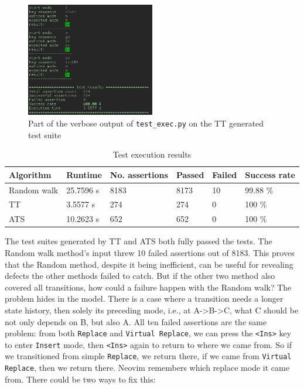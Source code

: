 \documentclass[12pt]{article}
\begin{document}
		\begin{figure}[!h]
			\centering
			\includegraphics[width=0.5\textwidth]{images/test_exec_run_TT.png}
			\caption{Part of the verbose output of \texttt{test\_exec.py} on the TT generated test suite}
		\end{figure}

		\begin{table}[h!]
		\begin{center}
			\begin{tabular}{l|l|l||l|l|l}
			\textbf{Algorithm} & \textbf{Runtime} & \textbf{No. assertions} & \textbf{Passed} & \textbf{Failed} & \textbf{Success rate}\\
			\hline
			Random walk & 25.7596 s & 8183 & 8173 & 10 & 99.88 \%\\
			\hline
			TT & 3.5577 s & 274 & 274 & 0 & 100 \%\\
			\hline
			ATS & 10.2623 s & 652 & 652 & 0 & 100 \%\\
			\hline
		\end{tabular}
		\caption{Test execution results}
		\end{center}
		\end{table}

		The test suites generated by TT and ATS both fully passed the tests. The Random walk method's input threw 10 failed assertions out of 8183. This proves that the Random method, despite it being inefficient, can be useful for revealing defects the other methods failed to catch. But if the other two method also covered all transitions, how could a failure happen with the Random walk? The problem hides in the model. There is a case where a transition needs a longer state history, then solely its preceding mode, i.e., at A->B->C, what C should be not only depends on B, but also A. All ten failed assertions are the same problem: from both \verb|Replace| and \verb|Virtual Replace|, we can press the \verb|<Ins>| key to enter \verb|Insert| mode, then \verb|<Ins>| again to return to where we came from. So if we transitioned from simple \verb|Replace|, we return there, if we came from \verb|Virtual Replace|, then we return there. Neovim remembers which replace mode it came from. There could be two ways to fix this:
\end{document}
